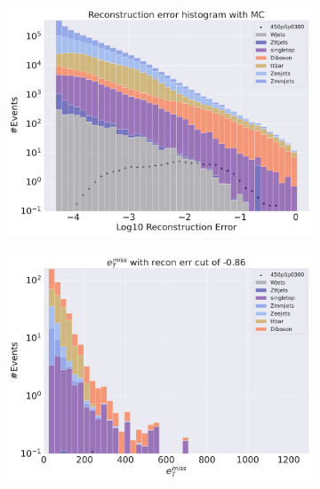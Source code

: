 \begin{figure}[H]
    \centering
    \begin{subfigure}{.40\textwidth}
        \includegraphics[width=\textwidth]{Figures/AE_testing/small/2lep/b_data_recon_big_rm3_feats_sig_450p0p0300_.pdf}
        \caption{ }
        \label{fig:AE_2lep_small_450_3}
    \end{subfigure}
    \hfill
    \begin{subfigure}{.40\textwidth}
        \includegraphics[width=\textwidth]{Figures/AE_testing/small/2lep/b_data_recon_big_rm3_feats_sig_450p0p0300_recon_errcut_-0.86.pdf}
        \caption{}
        \label{fig:AE_2lep_small_etmiss_450_3}
    \end{subfigure}

\end{figure}
